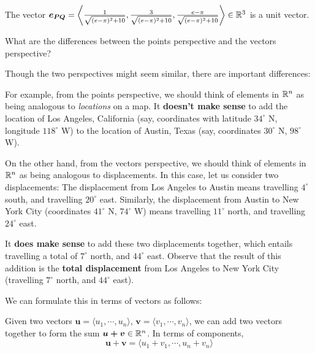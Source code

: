     \begin{example}
    The vector $\bm{e_{PQ}} = \left\langle \frac{1}{\sqrt{(e-\pi)^2+10}}, \frac{3}{\sqrt{(e-\pi)^2+10}}, \frac{e-\pi}{\sqrt{(e-\pi)^2+10}} \right\rangle \in \mathbb{R}^3$ is a unit vector.
    \end{example}







\begin{motivating}
What are the differences between the points perspective and the vectors perspective?
\end{motivating}

Though the two perspectives might seem similar, there are important differences:

For example, from the points perspective, we should think of elements in $\mathbb{R}^n$ as being analogous to \textit{locations} on a map.  It \textbf{doesn't make sense} to add the location of Los Angeles, California (say, coordinates with latitude $34^\circ$ N, longitude $118^\circ$ W) to the location of Austin, Texas (say, coordinates $30^\circ$ N, $98^\circ$ W).

On the other hand, from the vectors perspective, we should think of elements in $\mathbb{R}^n$ as being analogous to displacements.  In this case, let us consider two displacements:
The displacement from Los Angeles to Austin means travelling $4^\circ$ south, and travelling $20^\circ$ east. Similarly, the displacement from Austin to New York City (coordinates $41^\circ$ N, $74^\circ$ W) means travelling $11^\circ$ north, and travelling $24^\circ$ east.

It \textbf{does make sense} to add these two displacements together, which entails travelling a total of $7^\circ$ north, and $44^\circ$ east.  Observe that the result of this addition is the \textbf{total displacement} from Los Angeles to New York City (travelling $7^\circ$ north, and $44^\circ$ east).

We can formulate this in terms of vectors as follows:

\begin{definition}

 Given two vectors $\bm{u} = \langle u_1, \cdots, u_n \rangle$, $\bm{v} = \langle v_1, \cdots, v_n \rangle$, we can add  two vectors together to form the sum $\bm{u+v} \in \mathbb{R}^n$.  In terms of components,
$$\bm{u+v} = \langle u_1+v_1, \cdots, u_n+v_n \rangle$$

\end{definition}

